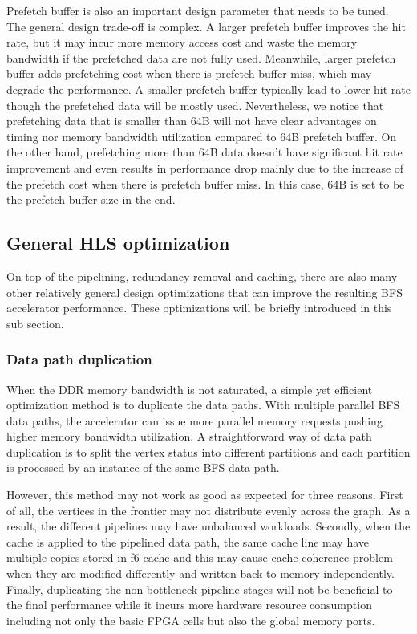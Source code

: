 Prefetch buffer is also an important design parameter that needs to be tuned.
The general design trade-off is complex.
A larger prefetch buffer improves the hit rate, but it may incur more memory 
access cost and waste the memory bandwidth if the prefetched data are 
not fully used. Meanwhile, larger prefetch buffer adds prefetching cost 
when there is prefetch buffer miss, which may degrade the performance. 
A smaller prefetch buffer typically lead to lower hit rate though 
the prefetched data will be mostly used. Nevertheless, we notice that 
prefetching data that is smaller than 64B will not have clear advantages on timing 
nor memory bandwidth utilization compared to 64B prefetch buffer. 
On the other hand, prefetching more than 64B data doesn't have 
significant hit rate improvement and even results in 
performance drop mainly due to the increase of the prefetch cost when there 
is prefetch buffer miss. In this case, 64B is set to be the prefetch buffer size 
in the end.

\subsection{General HLS optimization}
On top of the pipelining, redundancy removal and caching, there are also 
many other relatively general design optimizations that can improve the 
resulting BFS accelerator performance. These optimizations will be briefly 
introduced in this sub section.

\subsubsection{Data path duplication}
When the DDR memory bandwidth is not saturated, a simple 
yet efficient optimization method is to duplicate the data paths. 
With multiple parallel BFS data paths, the accelerator can issue more parallel 
memory requests pushing higher memory bandwidth utilization. A straightforward 
way of data path duplication is to split the vertex status into different 
partitions and each partition is processed by an instance of the same BFS data path.

However, this method may not work as good as expected for three reasons. 
First of all, the vertices in the frontier may not distribute evenly across the graph. 
As a result, the different pipelines may have unbalanced workloads. Secondly, 
when the cache is applied to the pipelined data path, the same cache line may 
have multiple copies stored in f6 cache and this may cause 
cache coherence problem when they are modified differently 
and written back to memory independently. Finally, duplicating 
the non-bottleneck pipeline stages will not be beneficial to 
the final performance while it incurs more hardware resource consumption 
including not only the basic FPGA cells but also the global memory ports. 

